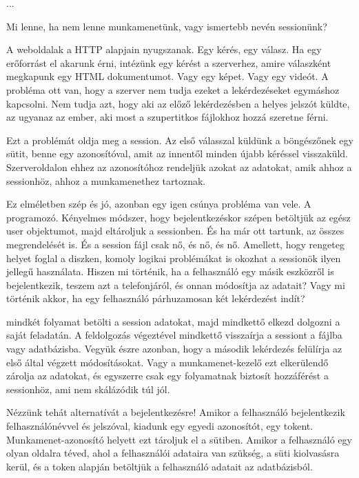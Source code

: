 

...


Mi lenne, ha nem lenne munkamenetünk, vagy ismertebb nevén sessionünk?

A weboldalak a HTTP alapjain nyugszanak. Egy kérés, egy válasz. Ha egy erőforrást el akarunk érni, intézünk egy kérést a szerverhez, amire válaszként megkapunk egy HTML dokumentumot. Vagy egy képet. Vagy egy videót. 
A probléma ott van, hogy a szerver nem tudja ezeket a lekérdezéseket egymáshoz kapcsolni. Nem tudja azt, hogy aki az előző lekérdezésben a helyes jelszót küldte, az ugyanaz az ember, aki most a szupertitkos fájlokhoz hozzá szeretne férni.

Ezt a problémát oldja meg a session. Az első válasszal küldünk a böngészőnek egy sütit, benne egy azonosítóval, amit az innentől minden újabb kéréssel visszaküld. Szerveroldalon ehhez az azonosítóhoz rendeljük azokat az adatokat, amik ahhoz a sessionhöz, ahhoz a munkamenethez tartoznak.

Ez elméletben szép és jó, azonban egy igen csúnya probléma van vele. A programozó.
Kényelmes módszer, hogy bejelentkezéskor szépen betöltjük az egész user objektumot, majd eltároljuk a sessionben. És ha már ott tartunk, az összes megrendelését is. És a session fájl csak nő, és nő, és nő.
Amellett, hogy rengeteg helyet foglal a diszken, komoly logikai problémákat is okozhat a sessionök ilyen jellegű használata. Hiszen mi történik, ha a felhasználó egy másik eszközről is bejelentkezik, teszem azt a telefonjáról, és onnan módosítja az adatait? Vagy mi történik akkor, ha egy felhasználó párhuzamosan két lekérdezést indít?

mindkét folyamat betölti a session adatokat, majd mindkettő elkezd dolgozni a saját feladatán. A feldolgozás végeztével mindkettő visszaírja a sessiont a fájlba vagy adatbázisba. Vegyük észre azonban, hogy a második lekérdezés felülírja az első által végzett módosításokat. Vagy a munkamenet-kezelő ezt elkerülendő zárolja az adatokat, és egyszerre csak egy folyamatnak biztosít hozzáférést a sessionhöz, ami nem skálázódik túl jól.

Nézzünk tehát alternatívát a bejelentkezésre!
Amikor a felhasználó bejelentkezik felhasználónévvel és jelszóval, kiadunk egy egyedi azonosítót, egy tokent. Munkamenet-azonosító helyett ezt tároljuk el a sütiben. Amikor a felhasználó egy olyan oldalra téved, ahol a felhasználói adataira van szükség, a süti kiolvasásra kerül, és a token alapján betöltjük a felhasználó adatait az adatbázisból.


